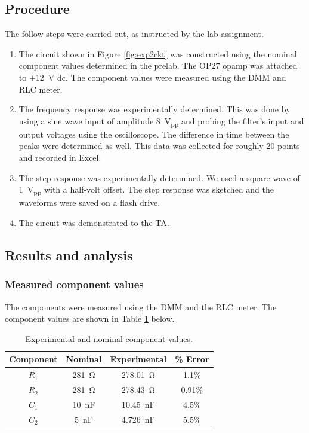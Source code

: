 \documentclass{report}
\newcommand{\pp}{_{pp}}
\newcommand{\Vpp}{\V\pp}
\begin{document}
\subsection{Procedure}
The follow steps were carried out, as instructed by the lab assignment.
\begin{enumerate}
	\item The circuit shown in Figure \ref{fig:exp2ckt} was constructed using the nominal component values determined in the prelab. The OP27 opamp was attached to $\pm$\SI{12}{\V} dc. The component values were measured using the DMM and RLC meter.
	\item The frequency response was experimentally determined. This was done by using a sine wave input of amplitude \SI{8}{\Vpp} and probing the filter's input and output voltages using the oscilloscope. The difference in time between the peaks were determined as well. This data was collected for roughly 20 points and recorded in Excel.
	\item The step response was experimentally determined. We used a square wave of \SI{1}{\Vpp} with a half-volt offset. The step response was sketched and the waveforms were saved on a flash drive.
	\item The circuit was demonstrated to the TA.
\end{enumerate}

\subsection{Results and analysis}

\subsubsection{Measured component values}
The components were measured using the DMM and the RLC meter. The component values are shown in Table \ref{table:lab2components} below.
\begin{table}[h]
	\centering
	\caption{Experimental and nominal component values.}
	\label{table:lab2components}
	\begin{threeparttable}
		\begin{tabular}{cccc}
			\toprule
			Component & Nominal & Experimental & \% Error \\
			\midrule
			$R_1$ & \SI{281}{\ohm} & \SI{278.01}{\ohm} & 1.1\% \\
			$R_2$ & \SI{281}{\ohm} & \SI{278.43}{\ohm} & 0.91\% \\
			$C_1$ & \SI{10}{\nano\farad} & \SI{10.45}{\nano\farad} & 4.5\% \\
			$C_2$ & \SI{5}{\nano\farad} & \SI{4.726}{\nano\farad} & 5.5\%\\
			\bottomrule
		\end{tabular}
	\end{threeparttable}
\end{table}
\end{document}

